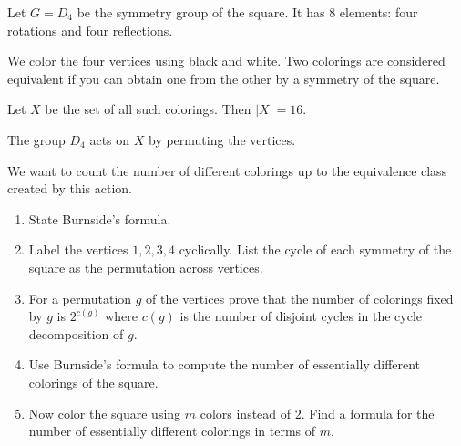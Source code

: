 \begin{prob}
    Let $G = D_4$ be the symmetry group of the square. It has 
    $8$ elements: four rotations and four reflections. 

    We color the four vertices using black and white. 
    Two colorings are considered equivalent if you can obtain 
    one from the other by a symmetry of the square. 

    Let $X$ be the set of all such colorings. 
    Then $|X| = 16$.

    The group $D_4$ acts on $X$ by permuting the vertices. 

    We want to count the number of different colorings up to 
    the equivalence class created by this action.

    \begin{enumerate}[label=\alph*)]
        \item State Burnside's formula. 
        \item Label the vertices $1,2,3,4$ cyclically. 
            List the cycle of each symmetry of the square 
            as the permutation across vertices. 
        \item For a permutation $g$ of the vertices
            prove that the number of colorings fixed by $g$ is 
            $2^{c(g)}$ where $c(g)$ is the number of disjoint cycles 
            in the cycle decomposition of $g$.
        \item Use Burnside's formula to compute the number of  
            essentially different colorings of the square. 
        \item Now color the square using $m$ colors instead of $2$. 
            Find a formula for the number of essentially different 
            colorings in terms of $m$.
    \end{enumerate}
\end{prob}

